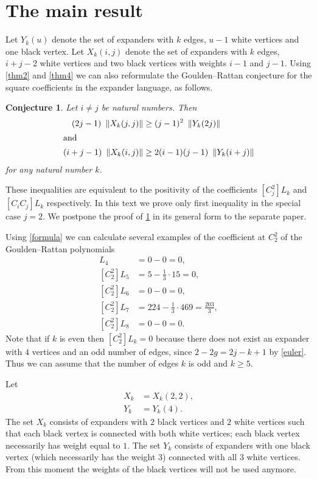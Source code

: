 \documentclass[submission]{FPSAC2021}
\newtheorem{con}{Conjecture}
\begin{document}
\section{The main result} 

Let $Y_k(u)$ denote the set of expanders 
with $k$ edges, $u-1$ white vertices and 
one black vertex. Let $X_k(i, j)$ denote 
the set of expanders with $k$ edges, 
$i+j-2$ white vertices and two black 
vertices with weights $i-1$ and $j-1$. 
Using  \cref{thm2} and \cref{thm4} we can 
also reformulate the Goulden--Rattan 
conjecture for the square coefficients 
in the expander language, as follows.
\begin{con} 
    \label{con:GJ2}
Let $i \neq j$ be natural numbers. Then 
\begin{align*}
(2j-1)\ \left\| X_k(j, j) \right\|    &   \geq (j-1)^2\ \left\| Y_k(2j) \right\| \\
\intertext{and}
(i+j-1)\ \left\| X_k(i, j) \right\|  & \geq 2(i-1)(j-1)\ \left\| Y_k(i+j) \right\|
\end{align*}
for any natural number $k$. 
\end{con}
These inequalities are equivalent to the 
positivity of the coefficients $[C_j^2] L_k$ 
and $[C_i C_j] L_k$ respectively. 
In this text we prove only first inequality  
in the special case 
$j=2$. We postpone the proof 
of \cref{con:GJ2}  
in its general form to the separate paper.

Using \cref{formula} 
we can calculate several examples of 
the coefficient at $C_2^2$ of 
the Goulden--Rattan polynomials
\begin{align*}
[C_2^2] L_4 &=0-0=0,\\
[C_2^2] L_5 &=5-\frac{1}{3} \cdot 15=0,\\
[C_2^2] L_6 &=0-0=0, \\
[C_2^2] L_7 &=224-\frac{1}{3} \cdot 469=\frac{203}{3}, \\
[C_2^2] L_8 &=0-0=0. 
\end{align*}
Note that if $k$ is even then $[C_2^2] L_k=0$ because there does not exist an expander with $4$ vertices and an odd number of edges, since
$2-2g=2j-k+1$ by \cref{euler}. Thus we can assume that the number of edges $k$ is odd and $k \geq 5$. 

Let 
\begin{align}
\label{xdef}
X_k &= X_k(2, 2), \\
\label{ydef}
Y_k &= Y_k(4).
\end{align}
The set $X_k$ consists of expanders with 
$2$ black vertices and $2$ white vertices
such that each black vertex is connected 
with both white vertices;
each black vertex necessarily has weight 
equal to $1$. The set $Y_k$ consists of 
expanders with one black vertex 
(which necessarily has the weight $3$) 
connected with all $3$ white vertices. 
From this moment the weights of the black 
vertices will not be used anymore.
\end{document}
